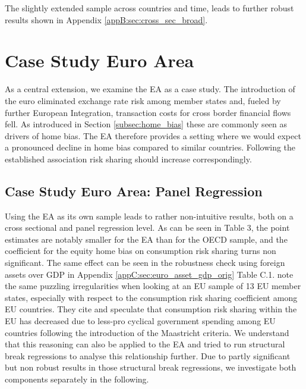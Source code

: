 \documentclass[11pt,a4paper]{article}
\begin{document}
The slightly extended sample across countries and time, leads to further robust results shown in Appendix \ref{appB:sec:cross_sec_broad}.



\section{Case Study Euro Area}\label{sec:euro_case}

As a central extension, we examine the EA as a case study. The introduction of the euro eliminated exchange rate risk among member states and, fueled by further European Integration, 
transaction costs for cross border financial flows fell. As introduced in Section \ref{subsec:home_bias} these are commonly seen as drivers of home bias.
The EA therefore provides a setting where we would expect a pronounced decline in home bias compared to similar countries. Following the established association risk sharing should increase correspondingly.

\subsection{Case Study Euro Area: Panel Regression}

Using the EA as its own sample leads to rather non-intuitive results, both on a cross sectional and panel regression level. As can be seen in Table 3, the point 
estimates are notably smaller for the EA than for the OECD sample, and the coefficient for the equity home bias on consumption risk sharing turns non significant. The same effect can be seen in the robustness check using foreign assets over GDP in Appendix \ref{appC:sec:euro_asset_gdp_orig} Table C.1.
\textcite{main} note the same puzzling irregularities when looking at an EU sample of 13 EU member states, especially with respect to the consumption risk sharing coefficient among EU countries. They cite 
\textcite{BalliSorensen2006} and speculate that consumption risk sharing within the EU has decreased due to less-pro cyclical government spending among EU countries following the introduction of the Maastricht criteria. We 
understand that this reasoning can also be applied to the EA and tried to run structural break regressions to analyse this relationship further. Due to partly significant but non robust results in those structural break regressions, we investigate both components separately in the following.
\end{document}
